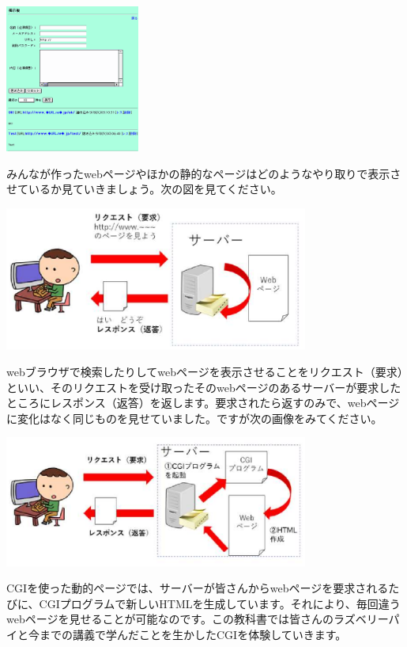 \documentclass[a4paper,12pt,dvipdfmx]{jarticle}
\begin{document}
\centering
\includegraphics[width=4.431cm]{ome7-img048.png}
\flushleft





\bigskip

みんなが作ったwebページやほかの静的なページはどのようなやり取りで表示させているか見ていきましょう。次の図を見てください。

\bigskip

\clearpage


\centering
\includegraphics[width=0.75\textwidth]{ome7-img049}
\flushleft


webブラウザで検索したりしてwebページを表示させることをリクエスト（要求）といい、そのリクエストを受け取ったそのwebページのあるサーバーが要求したところにレスポンス（返答）を返します。要求されたら返すのみで、webページに変化はなく同じものを見せていました。ですが次の画像をみてください。


\bigskip

\centering
\includegraphics[width=0.75\textwidth]{ome7-img050}
\flushleft


CGIを使った動的ページでは、サーバーが皆さんからwebページを要求されるたびに、CGIプログラムで新しいHTMLを生成しています。それにより、毎回違うwebページを見せることが可能なのです。この教科書では皆さんのラズベリーパイと今までの講義で学んだことを生かしたCGIを体験していきます。
\end{document}
